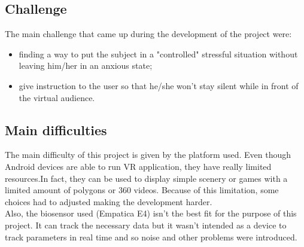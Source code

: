 \subsection{Challenge}
The main challenge that came up during the development of the project were:
\begin{itemize}
	\item finding a way to put the subject in a "controlled" stressful situation without leaving him/her in an anxious state;
	\item give instruction to the user so that he/she won't stay silent while in front of the virtual audience.
\end{itemize}


\subsection{Main difficulties}
The main difficulty of this project is given by the platform used. Even though Android devices are able to run VR application, they have really limited resources.In fact, they can be used to display simple scenery or games with a limited amount of polygons or 360\textdegree{} videos. Because of this limitation, some choices had to adjusted making the development harder.\\
Also, the biosensor used (Empatica E4) isn't the best fit for the purpose of this project. It can track the necessary data but it wasn't intended as a device to track parameters in real time and so noise and other problems were introduced.
